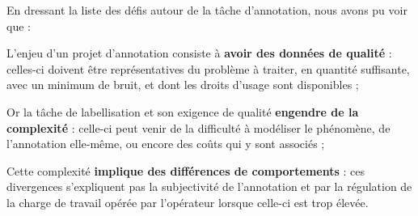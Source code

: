 	\begin{leftBarSummary}
		En dressant la liste des défis autour de la tâche d'annotation, nous avons pu voir que :
		\begin{todolist}
			\item[\itemok] L'enjeu d'un projet d'annotation consiste à \textbf{avoir des données de qualité} :
			celles-ci doivent être représentatives du problème à traiter, en quantité suffisante, avec un minimum de bruit, et dont les droits d'usage sont disponibles ;
			\item[\itemok] Or la tâche de labellisation et son exigence de qualité \textbf{engendre de la complexité} :
			celle-ci peut venir de la difficulté à modéliser le phénomène, de l'annotation elle-même, ou encore des coûts qui y sont associés ;
			\item[\itemok] Cette complexité \textbf{implique des différences de comportements} : ces divergences s'expliquent pas la subjectivité de l'annotation et par la régulation de la charge de travail opérée par l'opérateur lorsque celle-ci est trop élevée.
		\end{todolist}
	\end{leftBarSummary}